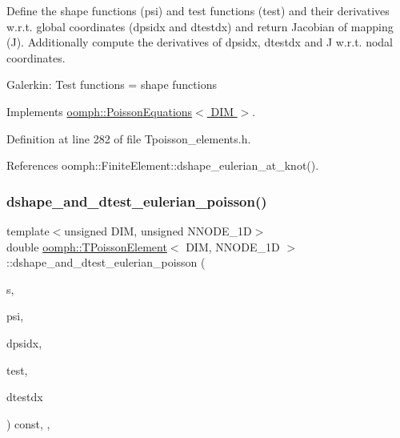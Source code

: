 Define the shape functions (psi) and test functions (test) and their derivatives w.\+r.\+t. global coordinates (dpsidx and dtestdx) and return Jacobian of mapping (J). Additionally compute the derivatives of dpsidx, dtestdx and J w.\+r.\+t. nodal coordinates.

Galerkin\+: Test functions = shape functions 

Implements \hyperlink{classoomph_1_1PoissonEquations_a09f816da9c9b23fd6a308601fe536cef}{oomph\+::\+Poisson\+Equations$<$ D\+I\+M $>$}.



Definition at line 282 of file Tpoisson\+\_\+elements.\+h.



References oomph\+::\+Finite\+Element\+::dshape\+\_\+eulerian\+\_\+at\+\_\+knot().

\mbox{\label{classoomph_1_1TPoissonElement_aa15655fd7d9489a77b6d6c82f18946e4}} 
\subsubsection{\texorpdfstring{dshape\+\_\+and\+\_\+dtest\+\_\+eulerian\+\_\+poisson()}{dshape\_and\_dtest\_eulerian\_poisson()}}
{\footnotesize\ttfamily template$<$unsigned D\+IM, unsigned N\+N\+O\+D\+E\+\_\+1D$>$ \\
double \hyperlink{classoomph_1_1TPoissonElement}{oomph\+::\+T\+Poisson\+Element}$<$ D\+IM, N\+N\+O\+D\+E\+\_\+1D $>$\+::dshape\+\_\+and\+\_\+dtest\+\_\+eulerian\+\_\+poisson (\begin{DoxyParamCaption}\item[{const \hyperlink{classoomph_1_1Vector}{Vector}$<$ double $>$ \&}]{s,  }\item[{\hyperlink{classoomph_1_1Shape}{Shape} \&}]{psi,  }\item[{\hyperlink{classoomph_1_1DShape}{D\+Shape} \&}]{dpsidx,  }\item[{\hyperlink{classoomph_1_1Shape}{Shape} \&}]{test,  }\item[{\hyperlink{classoomph_1_1DShape}{D\+Shape} \&}]{dtestdx }\end{DoxyParamCaption}) const\hspace{0.3cm}{\ttfamily [inline]}, {\ttfamily [protected]}, {\ttfamily [virtual]}}



